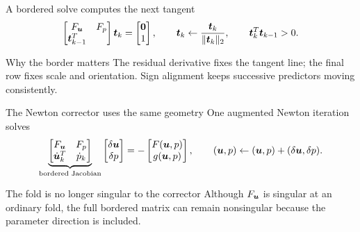 \begin{frame}{A bordered solve computes the next tangent}
\[
\begin{bmatrix}
F_{\bm{u}} & F_p\\
\bm{t}_{k-1}^{T}
\end{bmatrix}
\bm{t}_k=
\begin{bmatrix}\bm{0}\\1\end{bmatrix},
\qquad
\bm{t}_k\leftarrow\frac{\bm{t}_k}{\|\bm{t}_k\|_2},
\qquad
\bm{t}_k^T\bm{t}_{k-1}>0.
\]
\begin{block}{Why the border matters}
The residual derivative fixes the tangent line; the final row fixes scale and
orientation. Sign alignment keeps successive predictors moving consistently.
\end{block}
\end{frame}

\begin{frame}{The Newton corrector uses the same geometry}
One augmented Newton iteration solves
\[
\underbrace{\begin{bmatrix}
F_{\bm{u}} & F_p\\
\dot{\bm{u}}_k^T & \dot p_k
\end{bmatrix}}_{\text{bordered Jacobian}}
\begin{bmatrix}\delta\bm{u}\\\delta p\end{bmatrix}
=-
\begin{bmatrix}F(\bm{u},p)\\g(\bm{u},p)\end{bmatrix},
\qquad
(\bm{u},p)\leftarrow(\bm{u},p)+(\delta\bm{u},\delta p).
\]
\begin{alertblock}{The fold is no longer singular to the corrector}
Although $F_{\bm{u}}$ is singular at an ordinary fold, the full bordered
matrix can remain nonsingular because the parameter direction is included.
\end{alertblock}
\end{frame}

